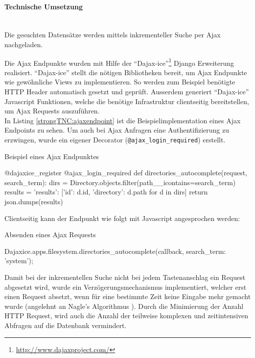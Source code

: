 \paragraph{Technische Umsetzung} \hspace{0pt} \\
Die gesuchten Datensätze werden mittels inkrementeller Suche per Ajax
nachgeladen.

Die Ajax Endpunkte wurden mit Hilfe der \enquote{Dajax-ice}\footnote{\url{http://www.dajaxproject.com/}} Django Erweiterung realisiert.
\enquote{Dajax-ice} stellt die nötigen Bibliotheken bereit, um Ajax Endpunkte wie gewöhnliche Views zu implementieren. So werden zum Beispiel benötigte HTTP Header
automatisch gesetzt und geprüft. Ausserdem generiert \enquote{Dajax-ice} Javascript Funktionen, welche die benötige Infrastruktur clientseitig bereitstellen, um Ajax Requests auszuführen.
\\

In Listing \autoref{strongTNC:ajaxendpoint} ist die Beispielimplementation eines Ajax Endpoints zu sehen. Um auch bei Ajax Anfragen eine Authentifizierung zu erzwingen, wurde ein eigener Decorator (\texttt{@ajax\_login\_required}) erstellt. 
\begin{listing}
\caption{Beispiel eines Ajax Endpunktes}
\label{strongTNC:ajaxendpoint}
\begin{pythoncode}
@dajaxice_register
@ajax_login_required
def directories_autocomplete(request, search_term):
    dirs = Directory.objects.filter(path__icontains=search_term)
    results = {'results': [{'id': d.id, 'directory': d.path} for d in dirs]}
    return json.dumps(results)
\end{pythoncode}
\end{listing}

Clientseitig kann der Endpunkt wie folgt mit Javascript angesprochen werden:
\begin{listing}
\caption{Absenden eines Ajax Requests}
\begin{jscode}
Dajaxice.apps.filesystem.directories_autocomplete(callback, {search_term: 'system'});
\end{jscode} 
\end{listing}

Damit bei der inkrementellen Suche nicht bei jedem Tastenanschlag ein Request
abgesetzt wird, wurde ein Verzögerungsmechanismus implementiert, welcher erst einen Request
absetzt, wenn für eine bestimmte Zeit keine Eingabe mehr gemacht wurde (angelehnt an Nagle's Algorithmus \cite{nagle1984congestion}).
Durch die Minimierung der Anzahl HTTP Request, wird auch die Anzahl der teilweise komplexen und zeitintensiven Abfragen auf die Datenbank vermindert.


